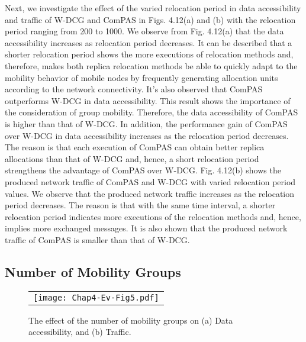 Next, we investigate the effect of the varied relocation period in data accessibility and traffic of W-DCG and ComPAS in Figs. 4.12(a) and (b) with the relocation period ranging from 200 to 1000. We observe from Fig. 4.12(a) that the data accessibility increases as relocation period decreases. It can be described that a shorter relocation period shows the more executions of relocation methods and, therefore, makes both replica relocation methods be able to quickly adapt to the mobility behavior of mobile nodes by frequently generating allocation units according to the network connectivity. It's also observed that ComPAS outperforms W-DCG in data accessibility. This result shows the importance of the consideration of group mobility. Therefore, the data accessibility of ComPAS is higher than that of W-DCG. In addition, the performance gain of ComPAS over W-DCG in data accessibility increases as the relocation period decreases. The reason is that each execution of ComPAS can obtain better replica allocations than that of W-DCG and, hence, a short relocation period strengthens the advantage of ComPAS over W-DCG. Fig. 4.12(b) shows the produced network traffic of ComPAS and W-DCG with varied relocation period values. We observe that the produced network traffic increases as the relocation period decreases. The reason is that with the same time interval, a shorter relocation period indicates more executions of the relocation methods and, hence, implies more exchanged messages. It is also shown that the produced network traffic of ComPAS is smaller than that of W-DCG.


\subsection{Number of Mobility Groups}\label{Chap4_05_04}
\begin{figure}[h]
\begin{center}
  \begin{tabular}{c}
  \texttt{[image: Chap4-Ev-Fig5.pdf]}
  \end{tabular}
  \caption{The effect of the number of mobility groups on (a) Data accessibility, and (b) Traffic.}
\end{center}
\end{figure}

